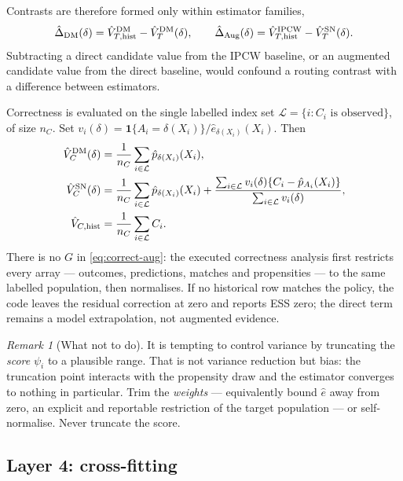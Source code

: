 \documentclass[11pt,a4paper]{article}
\theoremstyle{plain}
\theoremstyle{definition}
\theoremstyle{remark}
\newtheorem*{remark*}{Remark}
\newcommand{\one}[1]{\mathbf 1\{#1\}}
\begin{document}
Contrasts are therefore formed only within estimator families,
\begin{equation}
\hat\Delta_{\rm DM}(\delta)=\hat V^{\rm DM}_{T,\rm hist}-\hat V^{\rm DM}_T(\delta),
\qquad
\hat\Delta_{\rm Aug}(\delta)=\hat V^{\rm IPCW}_{T,\rm hist}-\hat V^{\rm SN}_T(\delta).
\label{eq:like-with-like}
\end{equation}
Subtracting a direct candidate value from the IPCW baseline, or an augmented candidate value
from the direct baseline, would confound a routing contrast with a difference between estimators.

Correctness is evaluated on the single labelled index set
$\mathcal L=\{i:C_i\text{ is observed}\}$, of size $n_C$. Set
$v_i(\delta)=\one{A_i=\delta(X_i)}/\hat e_{\delta(X_i)}(X_i)$. Then
\begin{align}
\hat V^{\rm DM}_C(\delta)
&=\frac1{n_C}\sum_{i\in\mathcal L}\hat p_{\delta(X_i)}(X_i),
\label{eq:correct-dm}\\
\hat V^{\rm SN}_C(\delta)
&=\frac1{n_C}\sum_{i\in\mathcal L}\hat p_{\delta(X_i)}(X_i)
+\frac{\sum_{i\in\mathcal L}v_i(\delta)
  \{C_i-\hat p_{A_i}(X_i)\}}
 {\sum_{i\in\mathcal L}v_i(\delta)},
\label{eq:correct-aug}\\
\hat V_{C,\rm hist}&=\frac1{n_C}\sum_{i\in\mathcal L}C_i.
\label{eq:correct-hist}
\end{align}
There is no $G$ in \eqref{eq:correct-aug}: the executed correctness analysis first restricts
every array --- outcomes, predictions, matches and propensities --- to the same labelled
population, then normalises. If no historical row matches the policy, the code leaves the
residual correction at zero and reports ESS zero; the direct term remains a model extrapolation,
not augmented evidence.

\begin{remark*}[What not to do]
It is tempting to control variance by truncating the \emph{score} $\psi_i$ to a plausible range.
That is not variance reduction but bias: the truncation point interacts with the propensity draw
and the estimator converges to nothing in particular. Trim the \emph{weights} --- equivalently
bound $\hat e$ away from zero, an explicit and reportable restriction of the target population
--- or self-normalise. Never truncate the score.
\end{remark*}

\subsection{Layer 4: cross-fitting}\label{sec:crossfit}
\end{document}
